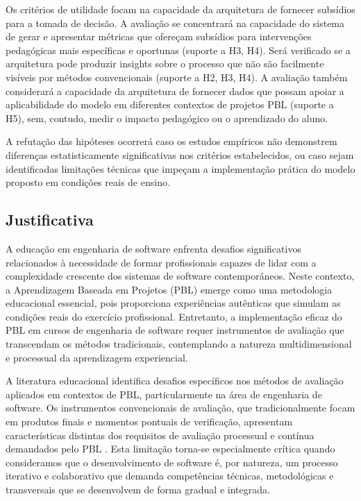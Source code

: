 \documentclass[12pt,a4paper]{article}
\begin{document}
Os critérios de utilidade focam na capacidade da arquitetura de fornecer subsídios para a tomada de decisão. A avaliação se concentrará na capacidade do sistema de gerar e apresentar métricas que ofereçam subsídios para intervenções pedagógicas mais específicas e oportunas (suporte a H3, H4). Será verificado se a arquitetura pode produzir insights sobre o processo que não são facilmente visíveis por métodos convencionais (suporte a H2, H3, H4). A avaliação também considerará a capacidade da arquitetura de fornecer dados que possam apoiar a aplicabilidade do modelo em diferentes contextos de projetos PBL (suporte a H5), sem, contudo, medir o impacto pedagógico ou o aprendizado do aluno.

A refutação das hipóteses ocorrerá caso os estudos empíricos não demonstrem 
diferenças estatisticamente significativas nos critérios estabelecidos, ou caso 
sejam identificadas limitações técnicas que impeçam a implementação prática do modelo proposto em condições reais de ensino.


\subsection{Justificativa}

A educação em engenharia de software enfrenta desafios significativos
relacionados à necessidade de formar profissionais capazes de lidar com a
complexidade crescente dos sistemas de software contemporâneos. Neste contexto,
a Aprendizagem Baseada em Projetos (PBL) emerge como uma metodologia
educacional essencial, pois proporciona experiências autênticas que simulam as
condições reais do exercício profissional. Entretanto, a implementação eficaz
do PBL em cursos de engenharia de software requer instrumentos de avaliação que
transcendam os métodos tradicionais, contemplando a natureza multidimensional e
processual da aprendizagem experiencial.

A literatura educacional identifica desafios específicos nos métodos de
avaliação aplicados em contextos de PBL, particularmente na área de engenharia
de software. Os instrumentos convencionais de avaliação, que tradicionalmente
focam em produtos finais e momentos pontuais de verificação, apresentam
características distintas dos requisitos de avaliação processual e contínua
demandados pelo PBL \cite{hmelo2004}. Esta limitação torna-se especialmente
crítica quando consideramos que o desenvolvimento de software é, por natureza,
um processo iterativo e colaborativo \cite{pressman2021} que demanda competências técnicas,
metodológicas e transversais que se desenvolvem de forma gradual e integrada.
\end{document}
